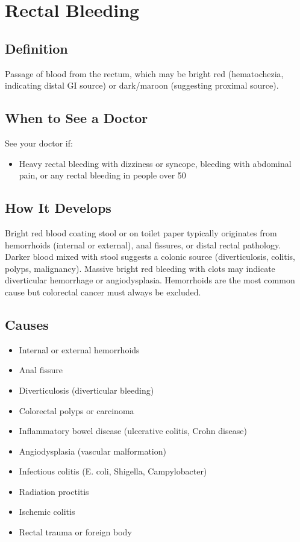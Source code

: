 \chapter{Rectal Bleeding}

\section*{Definition}
Passage of blood from the rectum, which may be bright red (hematochezia, indicating distal GI source) or dark/maroon (suggesting proximal source).

\section*{When to See a Doctor}
See your doctor if:
\begin{itemize}
  \item Heavy rectal bleeding with dizziness or syncope, bleeding with abdominal pain, or any rectal bleeding in people over 50
\end{itemize}

\section*{How It Develops}
Bright red blood coating stool or on toilet paper typically originates from hemorrhoids (internal or external), anal fissures, or distal rectal pathology. Darker blood mixed with stool suggests a colonic source (diverticulosis, colitis, polyps, malignancy). Massive bright red bleeding with clots may indicate diverticular hemorrhage or angiodysplasia. Hemorrhoids are the most common cause but colorectal cancer must always be excluded.

\section*{Causes}
\begin{itemize}
  \item Internal or external hemorrhoids
  \item Anal fissure
  \item Diverticulosis (diverticular bleeding)
  \item Colorectal polyps or carcinoma
  \item Inflammatory bowel disease (ulcerative colitis, Crohn disease)
  \item Angiodysplasia (vascular malformation)
  \item Infectious colitis (E. coli, Shigella, Campylobacter)
  \item Radiation proctitis
  \item Ischemic colitis
  \item Rectal trauma or foreign body
\end{itemize}

